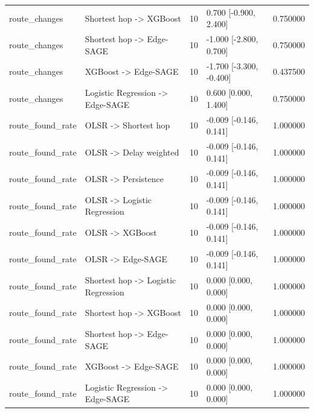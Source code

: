 \begin{table}[tb]
\begin{tabular}{llrlr}
route\_changes & Shortest hop -> XGBoost & 10 & 0.700 [-0.900, 2.400] & 0.750000 \\
route\_changes & Shortest hop -> Edge-SAGE & 10 & -1.000 [-2.800, 0.700] & 0.750000 \\
route\_changes & XGBoost -> Edge-SAGE & 10 & -1.700 [-3.300, -0.400] & 0.437500 \\
route\_changes & Logistic Regression -> Edge-SAGE & 10 & 0.600 [0.000, 1.400] & 0.750000 \\
route\_found\_rate & OLSR -> Shortest hop & 10 & -0.009 [-0.146, 0.141] & 1.000000 \\
route\_found\_rate & OLSR -> Delay weighted & 10 & -0.009 [-0.146, 0.141] & 1.000000 \\
route\_found\_rate & OLSR -> Persistence & 10 & -0.009 [-0.146, 0.141] & 1.000000 \\
route\_found\_rate & OLSR -> Logistic Regression & 10 & -0.009 [-0.146, 0.141] & 1.000000 \\
route\_found\_rate & OLSR -> XGBoost & 10 & -0.009 [-0.146, 0.141] & 1.000000 \\
route\_found\_rate & OLSR -> Edge-SAGE & 10 & -0.009 [-0.146, 0.141] & 1.000000 \\
route\_found\_rate & Shortest hop -> Logistic Regression & 10 & 0.000 [0.000, 0.000] & 1.000000 \\
route\_found\_rate & Shortest hop -> XGBoost & 10 & 0.000 [0.000, 0.000] & 1.000000 \\
route\_found\_rate & Shortest hop -> Edge-SAGE & 10 & 0.000 [0.000, 0.000] & 1.000000 \\
route\_found\_rate & XGBoost -> Edge-SAGE & 10 & 0.000 [0.000, 0.000] & 1.000000 \\
route\_found\_rate & Logistic Regression -> Edge-SAGE & 10 & 0.000 [0.000, 0.000] & 1.000000 \\
\bottomrule
\end{tabular}
\end{table}
